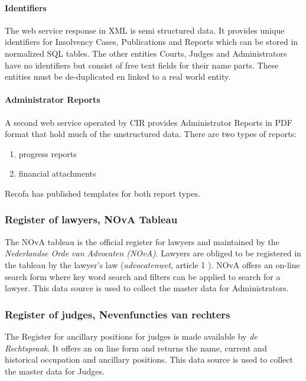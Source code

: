 \paragraph{Identifiers}
The web service response in XML is semi structured data. It provides unique identifiers for Insolvency Cases, Publications and Reports	which can be stored in normalized SQL tables. The other entities Courts, Judges and Administrators have no identifiers but consist of free text fields for their name parts. These entities must be de-duplicated en linked to a real world entity.

\paragraph{Administrator Reports}
A second web service operated by CIR provides Administrator Reports in PDF format that hold much of the unstructured data. There are two types of reports: 
\begin{enumerate}
\item progress reports
\item financial attachments
\end{enumerate}
Recofa has published templates for both report types\cite{rechtspraak:3}.


\subsubsection{Register of lawyers, NOvA Tableau}\label{NOvA Tableau}
The NOvA tableau is the official register for lawyers and maintained by the \textit{Nederlandse Orde van Advocaten (NOvA)}\cite{nova:1}. Lawyers are obliged to be registered in the tableau by the lawyer's law (\textit{advocatenwet}, article 1 \cite{law:2}). NOvA offers an on-line search form where key word search and filters can be applied to search for a lawyer. This data source is used to collect the master data for Administrators. 

\subsubsection{Register of judges, Nevenfuncties van rechters}\label{Nevenfuncties Rechters}
The Register for ancillary positions for judges is made available by \textit{de Rechtspraak}\cite{rechtspraak:2}. It offers an on line form and returns the name, current and historical occupation and ancillary positions. This data source is used to collect the master data for Judges.